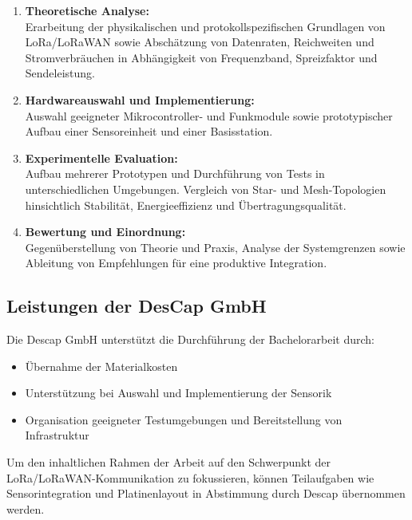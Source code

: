 {      \begin{enumerate}[noitemsep]
        \item \textbf{Theoretische Analyse: }\\
              Erarbeitung der physikalischen und protokollspezifischen Grundlagen von LoRa/LoRaWAN
              sowie Abschätzung von Datenraten, Reichweiten und Stromverbräuchen in Abhängigkeit von
              Frequenzband, Spreizfaktor und Sendeleistung.
        \item \textbf{Hardwareauswahl und Implementierung: }\\
              Auswahl geeigneter Mikrocontroller- und Funkmodule sowie prototypischer Aufbau einer
              Sensoreinheit und einer Basisstation.
        \item \textbf{Experimentelle Evaluation: }\\
              Aufbau mehrerer Prototypen und Durchführung von Tests in unterschiedlichen Umgebungen.
              Vergleich von Star- und Mesh-Topologien hinsichtlich Stabilität, Energieeffizienz und
              Übertragungsqualität.
        \item \textbf{Bewertung und Einordnung: }\\
              Gegenüberstellung von Theorie und Praxis, Analyse der Systemgrenzen sowie Ableitung von
              Empfehlungen für eine produktive Integration.
      \end{enumerate}

      \subsection*{Leistungen der DesCap GmbH}

      Die Descap GmbH unterstützt die Durchführung der Bachelorarbeit durch:

      \begin{itemize}[noitemsep]
        \item Übernahme der Materialkosten
        \item Unterstützung bei Auswahl und Implementierung der Sensorik
        \item Organisation geeigneter Testumgebungen und Bereitstellung von Infrastruktur
      \end{itemize}

      Um den inhaltlichen Rahmen der Arbeit auf den Schwerpunkt der LoRa/LoRaWAN-Kommunikation zu
      fokussieren, können Teilaufgaben wie Sensorintegration und Platinenlayout in Abstimmung durch
      Descap übernommen werden.

}
